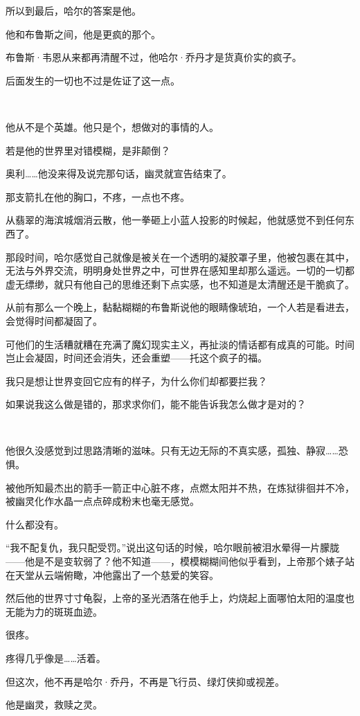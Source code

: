 \documentclass[../main]{subfiles}
\begin{document}
所以到最后，哈尔的答案是他。

他和布鲁斯之间，他是更疯的那个。

布鲁斯·韦恩从来都再清醒不过，他哈尔·乔丹才是货真价实的疯子。

后面发生的一切也不过是佐证了这一点。

~\

他从不是个英雄。他只是个，想做对的事情的人。

若是他的世界里对错模糊，是非颠倒？

奥利……他没来得及说完那句话，幽灵就宣告结束了。

那支箭扎在他的胸口，不疼，一点也不疼。

从翡翠的海滨城烟消云散，他一拳砸上小蓝人投影的时候起，他就感觉不到任何东西了。

那段时间，哈尔感觉自己就像是被关在一个透明的凝胶罩子里，他被包裹在其中，无法与外界交流，明明身处世界之中，可世界在感知里却那么遥远。一切的一切都虚无缥缈，就只有他自己的思维还剩下点实感，也不知道是太清醒还是干脆疯了。

从前有那么一个晚上，黏黏糊糊的布鲁斯说他的眼睛像琥珀，一个人若是看进去，会觉得时间都凝固了。

可他们的生活糟就糟在充满了魔幻现实主义，再扯淡的情话都有成真的可能。时间岂止会凝固，时间还会消失，还会重塑——托这个疯子的福。

我只是想让世界变回它应有的样子，为什么你们却都要拦我？

如果说我这么做是错的，那求求你们，能不能告诉我怎么做才是对的？

~\

他很久没感觉到过思路清晰的滋味。只有无边无际的不真实感，孤独、静寂……恐惧。

被他所知最杰出的箭手一箭正中心脏不疼，点燃太阳并不热，在炼狱徘徊并不冷，被幽灵化作水晶一点点碎成粉末也毫无感觉。

什么都没有。

“我不配复仇，我只配受罚。”说出这句话的时候，哈尔眼前被泪水晕得一片朦胧——他是不是变软弱了？他不知道——，模模糊糊间他似乎看到，上帝那个婊子站在天堂从云端俯瞰，冲他露出了一个慈爱的笑容。

然后他的世界寸寸龟裂，上帝的圣光洒落在他手上，灼烧起上面哪怕太阳的温度也无能为力的斑斑血迹。

很疼。

疼得几乎像是……活着。

但这次，他不再是哈尔·乔丹，不再是飞行员、绿灯侠抑或视差。

他是幽灵，救赎之灵。

~\
\end{document}
